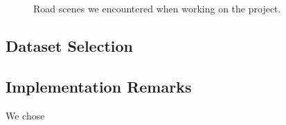 \begin{figure}[!t]
\begin{subfigure}[b]{0.4\textwidth}
        \caption[]{}
    \end{subfigure}
    \caption[Interreg dataset sample]{Road scenes we encountered when working on the \interreg{} project.}
    \label{fig:InterregDatasetSample}
\end{figure}


\subsection{Dataset Selection}

\subsection{Implementation Remarks}

We chose